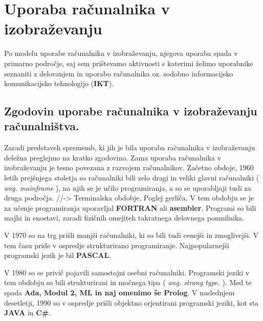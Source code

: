 

\section{Uporaba računalnika v izobraževanju}
\label{sec:uporaba-raunalnika-v}

Po modelu uporabe računalnika v izobraževanju, njegova uporaba spada v
primarno področje, saj sem prištevamo aktivnosti s katerimi želimo
uporabnike seznaniti z delovanjem in uporabo računalnika oz. sodobno
informacijsko komunikacijsko tehnologijo
(\textbf{IKT})\cite{model_uporabe_rac_izo-web}.


\subsection{Zgodovin uporabe računalnika v izobraževanju
računalništva.}\label{zgodovina_uporabe_racunalnika_v_izobrazevanju}

Zaradi predstaveh sprememb, ki jih je bila uporaba računalnika v
izobraževanju deležna preglejmo na kratko zgodovino. Zama uporaba
računalnika v izobraževanju je tesno povezana z razvojem računalnikov.
Začetno obdoje, 1960 letih prejšnjega stoletja so računalniki bili zelo
dragi in veliki glavni računalniki ( \emph{ang. mainframe} ), na njih se
je učilo programiranja, a so se uporabljaji tudi za druga področja.
//-\textgreater{} Terminalska obdobje, Poglej gerliča. V tem obdobju se
je za učenje programiranja uporavljal \textbf{FORTRAN} ali
\textbf{asembler}. Programi so bili majhi in enostavi, zaradi fizičnih
omejiteh takratnega delovnega pomnilnika.

V 1970 so na trg prišli manjši računalniki, ki so bili tudi cenejši in
zmoglivejši. V tem času pride v ospredje strukturirano programiranje.
Najpopularnejši programski jezik je bil \textbf{PASCAL}.

V 1980 so se privič pojavili samostojni osebni računalniki. Programski
jeziki v tem obdobju so bili strukturirani in močnega tipa ( \emph{ang.
strong type.} ). Med te spada \textbf{Ada, Modul 2, ML in naj omenimo še
Prolog}. V naslednjem desetletji, 1990 so v ospredje prišli objektno
orjentirani programski jeziki, kot sta \textbf{JAVA} in \textbf{C\#}.



